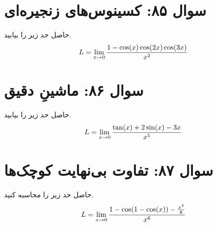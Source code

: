 \documentclass[12pt]{article}
\begin{document}
\vspace{1cm}
\hrulefill
\vspace{1cm}

\section*{سوال ۸۵: کسینوس‌های زنجیره‌ای}
حاصل حد زیر را بیابید.
\begin{displaymath}
	\Large L = \lim_{x \to 0} \frac{1 - \cos(x)\cos(2x)\cos(3x)}{x^2}
\end{displaymath}

\vspace{1cm}
\hrulefill
\vspace{1cm}

\section*{سوال ۸۶: ماشینِ دقیق}
حاصل حد زیر را بیابید.
\begin{displaymath}
	\Large L = \lim_{x \to 0} \frac{\tan(x) + 2\sin(x) - 3x}{x^5}
\end{displaymath}



\vspace{1cm}
\hrulefill
\vspace{1cm}

\section*{سوال ۸۷: تفاوت بی‌نهایت کوچک‌ها}
حاصل حد زیر را محاسبه کنید.
\begin{displaymath}
	\Large L = \lim_{x \to 0} \frac{1 - \cos(1 - \cos(x)) - \frac{x^4}{8}}{x^6}
\end{displaymath}






\vspace{1cm}
\hrulefill
\vspace{1cm}
\end{document}
